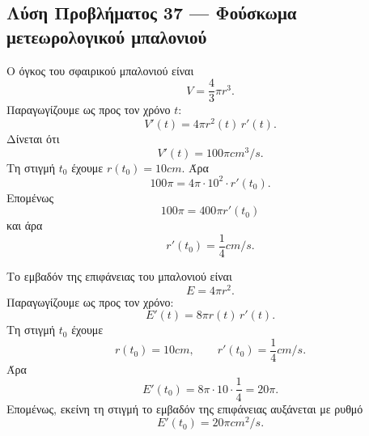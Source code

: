 \subsection*{Λύση Προβλήματος 37 --- Φούσκωμα μετεωρολογικού μπαλονιού}

\begin{alist}
  \item Ο όγκος του σφαιρικού μπαλονιού είναι
        \[
          V=\frac{4}{3}\pi r^3.
        \]
        Παραγωγίζουμε ως προς τον χρόνο $t$:
        \[
          V'(t)=4\pi r^2(t)\,r'(t).
        \]
        Δίνεται ότι
        \[
          V'(t)=100\pi\si{cm^3/s}.
        \]
        Τη στιγμή $t_0$ έχουμε $r(t_0)=10\si{cm}$. Άρα
        \[
          100\pi
          =
          4\pi\cdot 10^2\cdot r'(t_0).
        \]
        Επομένως
        \[
          100\pi=400\pi r'(t_0)
        \]
        και άρα
        \[
          {r'(t_0)=\frac14\si{cm/s}}.
        \]

  \item Το εμβαδόν της επιφάνειας του μπαλονιού είναι
        \[
          E=4\pi r^2.
        \]
        Παραγωγίζουμε ως προς τον χρόνο:
        \[
          E'(t)=8\pi r(t)\,r'(t).
        \]
        Τη στιγμή $t_0$ έχουμε
        \[
          r(t_0)=10\si{cm},
          \qquad
          r'(t_0)=\frac14\si{cm/s}.
        \]
        Άρα
        \[
          E'(t_0)
          =
          8\pi\cdot10\cdot\frac14
          =
          20\pi.
        \]
        Επομένως, εκείνη τη στιγμή το εμβαδόν της επιφάνειας αυξάνεται
        με ρυθμό
        \[
          {E'(t_0)=20\pi\si{cm^2/s}}.
        \]
\end{alist}
